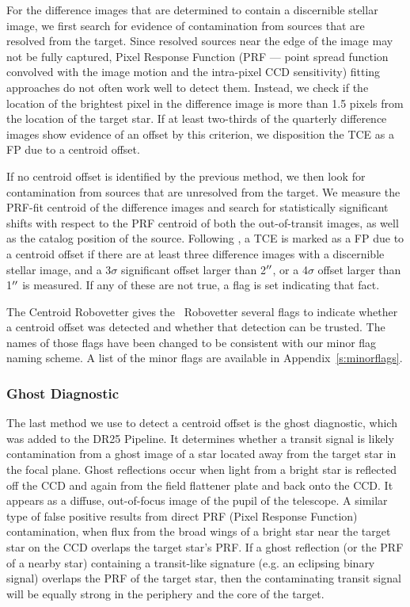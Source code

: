 For the difference images that are determined to contain a discernible stellar image, we first search for evidence of contamination from sources that are resolved from the target. Since resolved sources near the edge of the image may not be fully captured, Pixel Response Function (PRF --- \keplers{} point spread function convolved with the image motion and the intra-pixel CCD sensitivity) fitting approaches do not often work well to detect them. Instead, we check if the location of the brightest pixel in the difference image is more than 1.5 pixels from the location of the target star. If at least two-thirds of the quarterly difference images show evidence of an offset by this criterion, we disposition the TCE as a FP due to a centroid offset. %

If no centroid offset is identified by the previous method, we then look for contamination from sources that are unresolved from the target. We measure the PRF-fit centroid of the difference images and search for statistically significant shifts with respect to the PRF centroid of both the out-of-transit images, as well as the catalog position of the source. Following \citet{Bryson2013}, a TCE is marked as a FP due to a centroid offset if there are at least three difference images with a discernible stellar image, and a 3$\sigma$ significant offset larger than 2$\mbox{$^{\prime\prime}$}$, or a 4$\sigma$ offset larger than 1$\mbox{$^{\prime\prime}$}$ is measured.  If any of these are not true, a flag is set indicating that fact.

The Centroid Robovetter gives the \kepler\ Robovetter several flags to indicate whether a centroid offset was detected and whether that detection can be trusted. The names of those flags have been changed to be consistent with our minor flag naming scheme. A list of the minor flags are available in Appendix~\ref{s:minorflags}.


\subsubsection{Ghost Diagnostic}
\label{s:ghost}
The last method we use to detect a centroid offset is the ghost diagnostic, which was added to the DR25 \kepler{} Pipeline. It determines whether a transit signal is likely contamination from a ghost image of a star located away from the target star in the focal plane. Ghost reflections occur when light from a bright star is reflected off the CCD and again from the field flattener plate and back onto the CCD. It appears as a diffuse, out-of-focus image of the pupil of the telescope. A similar type of false positive results from direct PRF (Pixel Response Function) contamination, when flux from the broad wings of a bright star near the target star on the CCD overlaps the target star's PRF.  If a ghost reflection (or the PRF of a nearby star) containing a transit-like signature (e.g. an eclipsing binary signal) overlaps the PRF of the target star, then the contaminating transit signal will be equally strong in the periphery and the core of the target. 

